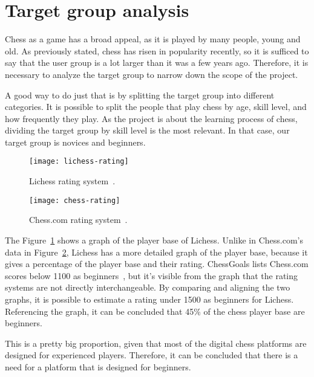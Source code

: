 \section{Target group analysis}\label{sec:target-group-analysis}

Chess as a game has a broad appeal, as it is played by many people, young and old.
As previously stated, chess has risen in popularity recently, so it is sufficed to say that the user group is a lot
larger than it was a few years ago.
Therefore, it is necessary to analyze the target group to narrow down the scope of the project.

A good way to do just that is by splitting the target group into different categories.
It is possible to split the people that play chess by age, skill level, and how frequently they play.
As the project is about the learning process of chess, dividing the target group by skill level is the most relevant.
In that case, our target group is novices and beginners.

\begin{figure}
    \centering
    \texttt{[image: lichess-rating]}
    \caption{Lichess rating system~\cite{chess-ratings}.}
    \label{fig:lichess-rating}
\end{figure}

\begin{figure}
    \centering
    \texttt{[image: chess-rating]}
    \caption{Chess.com rating system~\cite{chess-ratings}.}
    \label{fig:chess.com-rating}
\end{figure}


The Figure~\ref{fig:lichess-rating} shows a graph of the player base of Lichess.
Unlike in Chess.com's data in Figure~\ref{fig:chess.com-rating}, Lichess has a more detailed graph of the player base,
because it gives a percentage of the player base and their rating.
ChessGoals lists Chess.com scores below 1100 as beginners~\cite{chess-ratings}, but it's visible from the graph that
the rating systems are not directly interchangeable.
By comparing and aligning the two graphs, it is possible to estimate a rating under 1500 as beginners for Lichess.
Referencing the graph, it can be concluded that 45\% of the chess player base are beginners.

This is a pretty big proportion, given that most of the digital chess platforms are designed for experienced players.
Therefore, it can be concluded that there is a need for a platform that is designed for beginners.
